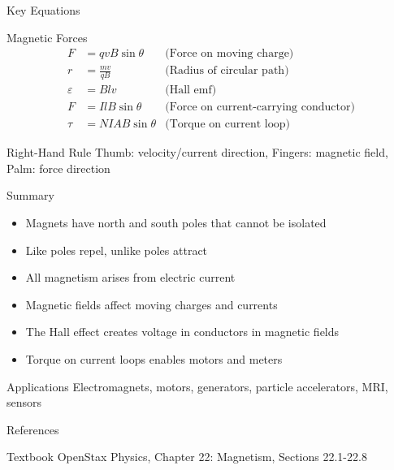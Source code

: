 \documentclass{beamer}
\begin{document}
\begin{frame}{Key Equations}
\begin{block}{Magnetic Forces}
\begin{align}
F &= qvB\sin\theta & \text{(Force on moving charge)} \\
r &= \frac{mv}{qB} & \text{(Radius of circular path)} \\
\varepsilon &= Blv & \text{(Hall emf)} \\
F &= IlB\sin\theta & \text{(Force on current-carrying conductor)} \\
\tau &= NIAB\sin\theta & \text{(Torque on current loop)}
\end{align}
\end{block}

\begin{block}{Right-Hand Rule}
Thumb: velocity/current direction, Fingers: magnetic field, Palm: force direction
\end{block}
\end{frame}

\begin{frame}{Summary}
\begin{itemize}
\item Magnets have north and south poles that cannot be isolated
\item Like poles repel, unlike poles attract
\item All magnetism arises from electric current
\item Magnetic fields affect moving charges and currents
\item The Hall effect creates voltage in conductors in magnetic fields
\item Torque on current loops enables motors and meters
\end{itemize}

\begin{block}{Applications}
Electromagnets, motors, generators, particle accelerators, MRI, sensors
\end{block}
\end{frame}

\begin{frame}{References}
\begin{block}{Textbook}
OpenStax Physics, Chapter 22: Magnetism, Sections 22.1-22.8
\end{block}
\end{frame}
\end{document}
